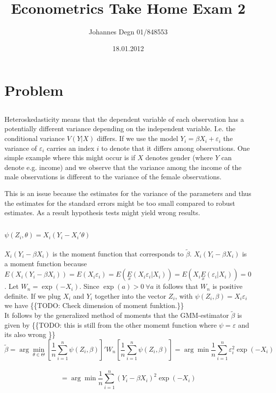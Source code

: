 \documentclass[11pt]{article}
\title{\textbf{Econometrics Take Home Exam 2}}
\author{Johannes Degn 01/848553}
\date{18.01.2012}
\theoremstyle{break}
\begin{document}
\maketitle


\section{Problem}
\subsection{}
Heteroskedasticity means that the dependent variable of each observation has a potentially different variance depending on the independent variable. I.e. the conditional variance $V(Y|X)$ differs. If we use the model $Y_i = \beta X_i + \varepsilon_i$ the variance of $\varepsilon_i$ carries an index $i$ to denote that it differs among observations. One simple example where this might occur is if $X$ denotes gender (where $Y$ can denote e.g. income) and we observe that the variance among the income of the male observations is different to the variance of the female observations.

This is an issue because the estimates for the variance of the parameters and thus the estimates for the standard errors might be too small compared to robust estimates. As a result hypothesis tests might yield wrong results.
\subsection{}
$\psi(Z_i, \theta) = X_i(Y_i - X_i'\theta)$ \\
\\
$X_i(Y_i - \beta X_i)$ is the moment function that corresponds to $\tilde{\beta}$. $X_i(Y_i - \beta X_i)$ is a moment function because $E(X_i(Y_i - \beta X_i)) = E(X_i\varepsilon_i) = E(\underset{x}{E}(X_i\varepsilon_i|X_i)) = E(X_i\underset{x}{E}(\varepsilon_i|X_i)) = 0$. Let $W_n = \exp(-X_i)$. Since $\exp(a) > 0 \ \forall a$ it follows that $W_n$ is positive definite. If we plug $X_i$ and $Y_i$ together into the vector $Z_i$, with $\psi(Z_i, \beta) = X_i\varepsilon_i$ we have \{\{TODO: Check dimension of moment funktion.\}\}
\\
It follows by the generalized method of moments that the GMM-estimator $\tilde{\beta}$ is given by \{\{TODO: this is still from the other momemt function where $\psi = \varepsilon$ and its also wrong \}\}
$$\tilde{\beta} = \displaystyle \arg \min_{\theta \in \Theta} [\frac{1}{n} \displaystyle \sum_{i=1}^n \psi(Z_i, \beta)]'W_n[\frac{1}{n} \displaystyle \sum_{i=1}^n \psi(Z_i, \beta)] = \arg \min \frac{1}{n} \displaystyle \sum_{i=1}^n \varepsilon_i^2\exp(-X_i)$$ \\$$= \arg \min \frac{1}{n} \displaystyle \sum_{i=1}^n (Y_i-\beta X_i)^2\exp(-X_i)$$
\end{document}
